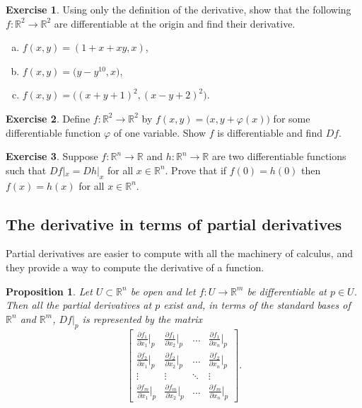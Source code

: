 \documentclass[12pt,openany]{book}
\newcommand{\R}{{\mathbb{R}}}
\theoremstyle{plain}
\newtheorem{prop}[thm]{Proposition}
\theoremstyle{remark}
\theoremstyle{definition}
\newenvironment{exbox}{%
    \def\FrameCommand{\vrule width 1pt \relax\hspace{10pt}}%
    \MakeFramed{\advance\hsize-\width\FrameRestore}%
}{%
    \endMakeFramed
}
\newenvironment{exparts}{%
    \leavevmode\begin{enumerate}[a),noitemsep,topsep=0pt,parsep=0pt,partopsep=0pt]
}{%
    \end{enumerate}
}
\theoremstyle{exercise}
\newtheorem{exercise}{Exercise}[section]
\theoremstyle{example}
\begin{document}
\begin{exbox}
\begin{samepage}
\begin{exercise}
Using only the definition of the derivative, show that
the following $f \colon \R^2 \to \R^2$ are differentiable at the origin and
find their derivative.
\begin{exparts}
\item
$f(x,y) = (1+x+xy,x)$,
\item
$f(x,y) = \bigl(y-y^{10},x \bigr)$,
\item
$f(x,y) = \bigl( {(x+y+1)}^2 , {(x-y+2)}^2 \bigr)$.
\end{exparts}
\end{exercise}
\end{samepage}

\begin{exercise}
Define $f \colon \R^2 \to \R^2$ by $f(x,y) =
\bigl(x,y+\varphi(x)\bigr)$ for some differentiable function $\varphi$ of one
variable.  Show $f$ is differentiable and find $Df$.
\end{exercise}

\begin{exercise}
Suppose $f \colon \R^n \to \R$ and $h \colon \R^n \to \R$ are two 
differentiable functions such that $Df|_x = Dh|_x$ for all $x \in \R^n$.
Prove that
if $f(0) = h(0)$ then $f(x) = h(x)$ for all $x \in \R^n$.
\end{exercise}
\end{exbox}


\subsection{The derivative in terms of partial derivatives}

Partial derivatives are easier to compute with all the machinery of
calculus, and they provide a way to compute the derivative of a
function.

\begin{prop} \label{mv:prop:jacobianmatrix}
Let $U \subset \R^n$ be open and let $f \colon U \to \R^m$ be
differentiable at $p \in U$.  Then all the partial derivatives at $p$
exist and, in terms of the standard bases of $\R^n$ and $\R^m$,
$Df|_p$ is represented by the matrix
\begin{equation*}
\begin{bmatrix}
\frac{\partial f_1}{\partial x_1}\big|_p
&
\frac{\partial f_1}{\partial x_2}\big|_p
& \ldots &
\frac{\partial f_1}{\partial x_n}\big|_p
\\[6pt]
\frac{\partial f_2}{\partial x_1}\big|_p
&
\frac{\partial f_2}{\partial x_2}\big|_p
& \ldots &
\frac{\partial f_2}{\partial x_n}\big|_p
\\
\vdots & \vdots & \ddots & \vdots
\\
\frac{\partial f_m}{\partial x_1}\big|_p
&
\frac{\partial f_m}{\partial x_2}\big|_p
& \ldots &
\frac{\partial f_m}{\partial x_n}\big|_p
\end{bmatrix} .
\end{equation*}
\end{prop}
\end{document}
